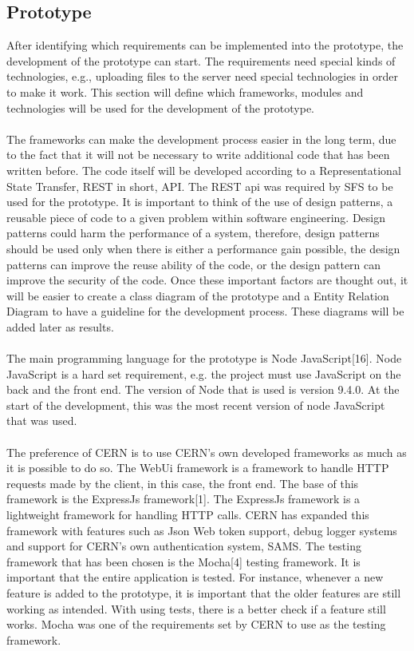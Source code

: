 \documentclass[paper=a4, fontsize=11pt,twoside]{scrartcl}	%
\begin{document}
\newpage
\subsection{Prototype}
After identifying which requirements can be implemented into the prototype, the development of the prototype can start. The requirements need special kinds of technologies, e.g., uploading files to the server need special technologies in order to make it work. This section will define which frameworks, modules and technologies will be used for the development of the prototype. \\ \\ 
The frameworks can make the development process easier in the long term, due to the fact that it will not be necessary to write additional code that has been written before. The code itself will be developed according to a Representational State Transfer, REST in short, API. The REST api was required by SFS to be used for the prototype. It is important to think of the use of design patterns, a reusable piece of code to a given problem within software engineering. Design patterns could harm the performance of a system, therefore, design patterns should be used only when there is either a performance gain possible, the design patterns can improve the reuse ability of the code, or the design pattern can improve the security of the code. Once these important factors are thought out, it will be easier to create a class diagram of the prototype and a Entity Relation Diagram to have a guideline for the development process. These diagrams will be added later as results. \\ \\
The main programming language for the prototype is Node JavaScript[16]. Node JavaScript is a hard set requirement, e.g. the project must use JavaScript on the back and the front end. The version of Node that is used is version 9.4.0. At the start of the development, this was the most recent version of node JavaScript that was used.  \\ \\
The preference of CERN is to use CERN's own developed frameworks as much as it is possible to do so. The WebUi framework is a framework to handle HTTP requests made by the client, in this case, the front end. The base of this framework is the ExpressJs framework[1]. The ExpressJs framework is a lightweight framework for handling HTTP calls. CERN has expanded this framework with features such as Json Web token support, debug logger systems and support for CERN's own authentication system, SAMS. The testing framework that has been chosen is the Mocha[4] testing framework. It is important that the entire application is tested. For instance, whenever a new feature is added to the prototype, it is important that the older features are still working as intended. With using tests, there is a better check if a feature still works. Mocha was one of the requirements set by CERN to use as the testing framework. \\
\end{document}
